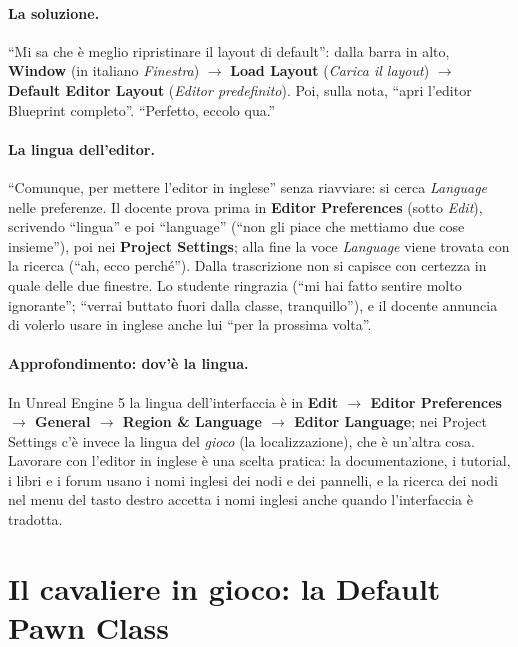 \paragraph{La soluzione.} ``Mi sa che è meglio ripristinare il layout di default'':
dalla barra in alto, \textbf{Window} (in italiano \emph{Finestra}) $\rightarrow$
\textbf{Load Layout} (\emph{Carica il layout}) $\rightarrow$ \textbf{Default Editor
Layout} (\emph{Editor predefinito}). Poi, sulla nota, ``apri l'editor Blueprint
completo''. ``Perfetto, eccolo qua.''

\paragraph{La lingua dell'editor.} ``Comunque, per mettere l'editor in inglese'' senza
riavviare: si cerca \emph{Language} nelle preferenze. Il docente prova prima in
\textbf{Editor Preferences} (sotto \emph{Edit}), scrivendo ``lingua'' e poi ``language''
(``non gli piace che mettiamo due cose insieme''), poi nei \textbf{Project Settings};
alla fine la voce \emph{Language} viene trovata con la ricerca (``ah, ecco perché'').
Dalla trascrizione non si capisce con certezza in quale delle due finestre. Lo studente
ringrazia (``mi hai fatto sentire molto ignorante''; ``verrai buttato fuori dalla
classe, tranquillo''), e il docente annuncia di volerlo usare in inglese anche lui ``per
la prossima volta''.

\paragraph{Approfondimento: dov'è la lingua.} In Unreal Engine 5 la lingua
dell'interfaccia è in \textbf{Edit $\rightarrow$ Editor Preferences $\rightarrow$ General
$\rightarrow$ Region \& Language $\rightarrow$ Editor Language}; nei Project Settings c'è
invece la lingua del \emph{gioco} (la localizzazione), che è un'altra cosa. Lavorare
con l'editor in inglese è una scelta pratica: la documentazione, i tutorial, i libri e i
forum usano i nomi inglesi dei nodi e dei pannelli, e la ricerca dei nodi nel menu del
tasto destro accetta i nomi inglesi anche quando l'interfaccia è tradotta.

\section{Il cavaliere in gioco: la Default Pawn Class}
\label{ue9:sec:pawnclass}

